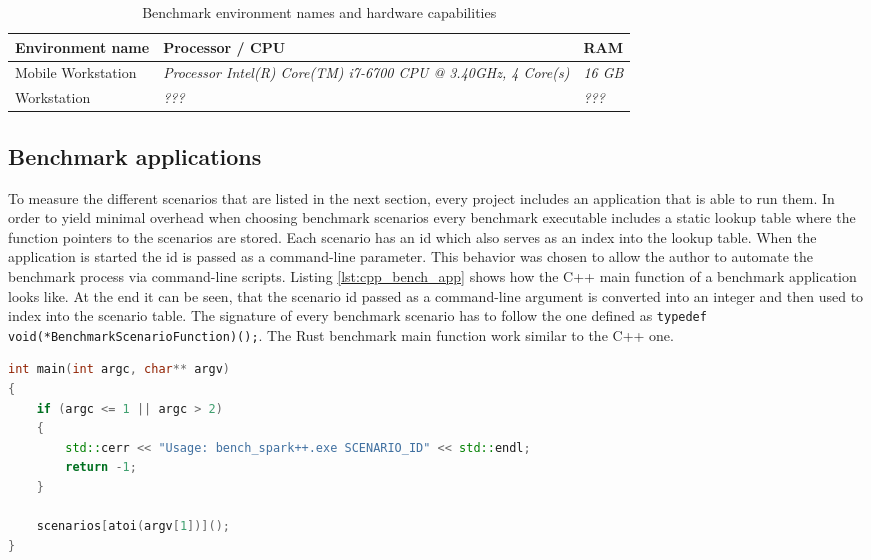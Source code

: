 \begin{table}[h!]
	\centering
	\label{my-label}
	\begin{tabular}{|l|l|l|}
		\hline
		\textbf{Environment name} & \textbf{Processor / CPU} & \textbf{RAM} \\ \hline
		Mobile Workstation	& \textit{Processor	Intel(R) Core(TM) i7-6700 CPU @ 3.40GHz, 4 Core(s)} & \textit{16 GB} \\ \hline
		Workstation			& \textit{???} & \textit{???} \\ \hline
	\end{tabular}
	\caption{Benchmark environment names and hardware capabilities}
\end{table}

\subsection{Benchmark applications}

To measure the different scenarios that are listed in the next section, every project includes an application that is able to run them. In order to yield minimal overhead when choosing benchmark scenarios every benchmark executable includes a static lookup table where the function pointers to the scenarios are stored. Each scenario has an id which also serves as an index into the lookup table. When the application is started the id is passed as a command-line parameter. This behavior was chosen to allow the author to automate the benchmark process via command-line scripts. Listing \ref{lst:cpp_bench_app} shows how the C++ main function of a benchmark application looks like. At the end it can be seen, that the scenario id passed as a command-line argument is converted into an integer and then used to index into the scenario table. The signature of every benchmark scenario has to follow the one defined as \texttt{typedef void(*BenchmarkScenarioFunction)();}. The Rust benchmark main function work similar to the C++ one.\\

\begin{lstlisting}[caption={Main function of the C++ benchmark app using a scenario lookup table}, label={lst:cpp_bench_app}, language={C++}]
int main(int argc, char** argv)
{
	if (argc <= 1 || argc > 2)
	{
		std::cerr << "Usage: bench_spark++.exe SCENARIO_ID" << std::endl;
		return -1;
	}
	
	scenarios[atoi(argv[1])]();
}
\end{lstlisting}


